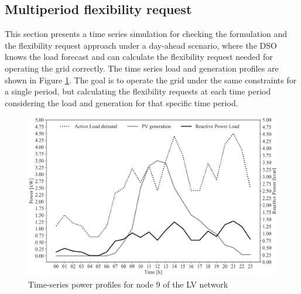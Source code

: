 \subsection{Multiperiod flexibility request}
This section presents a time series simulation for checking the formulation and the flexibility request approach under a day-ahead scenario, where the DSO knows the load forecast and can calculate the flexibility request needed for operating the grid correctly. The time series load and generation profiles are shown in Figure \ref{fig:data_opf_multiperiod}. The goal is to operate the grid under the same constraints for a single period, but calculating the flexibility requests at each time period considering the load and generation for that specific time period. 

%


\begin{figure}[htbp]
	\centering
	\includegraphics[width=0.8\columnwidth ]{ChapterOPF_DSO/Figures/p_q_profile_2.png}
		\caption{Time-series power profiles for node 9 of the LV network}
	\label{fig:data_opf_multiperiod}  
\end{figure}

